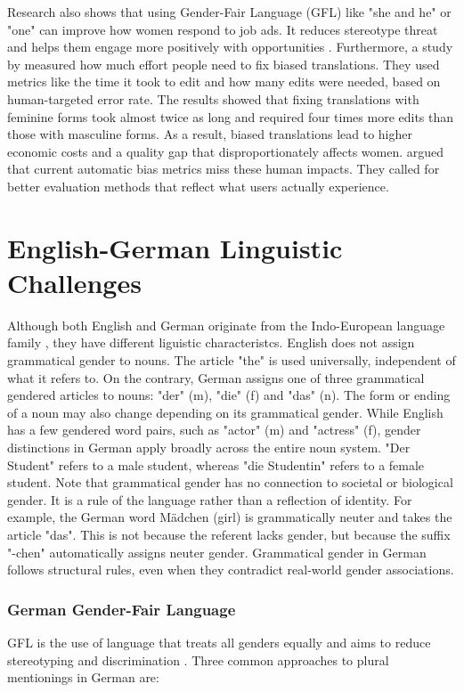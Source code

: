         Research also shows that using Gender-Fair Language (GFL) like "she and he" or "one" can improve how women respond to job ads. It reduces stereotype threat and helps them engage more positively with opportunities \parencite{godsilEffectsGenderRoles2016}. Furthermore, a study by \textcite{savoldiWhatHarmQuantifying2024} measured how much effort people need to fix biased translations. They used metrics like the time it took to edit and how many edits were needed, based on human-targeted error rate. The results showed that fixing translations with feminine forms took almost twice as long and required four times more edits than those with masculine forms. As a result, biased translations lead to higher economic costs and a quality gap that disproportionately affects women. \textcite{savoldiWhatHarmQuantifying2024} argued that current automatic bias metrics miss these human impacts. They called for better evaluation methods that reflect what users actually experience.

    \section{English-German Linguistic Challenges}
        Although both English and German originate from the Indo-European language family \parencite{baldiEnglishIndoEuropeanLanguage2008}, they have different liguistic characteristcs. English does not assign grammatical gender to nouns. The article "the" is used universally, independent of what it refers to. On the contrary, German assigns one of three grammatical gendered articles to nouns: "der" (m), "die" (f) and "das" (n). The form or ending of a noun may also change depending on its grammatical gender. While English has a few gendered word pairs, such as "actor" (m) and "actress" (f), gender distinctions in German apply broadly across the entire noun system. "Der Student" refers to a male student, whereas "die Studentin" refers to a female student. Note that grammatical gender has no connection to societal or biological gender. It is a rule of the language rather than a reflection of identity. For example, the German word Mädchen (girl) is grammatically neuter and takes the article "das". This is not because the referent lacks gender, but because the suffix "-chen" automatically assigns neuter gender. Grammatical gender in German follows structural rules, even when they contradict real-world gender associations.

    \subsubsection{German Gender-Fair Language} \label{subsection:german_gfl}
    GFL is the use of language that treats all genders equally and aims to reduce stereotyping and discrimination \parencite{sczesnyCanGenderFairLanguage2016}. Three common approaches to plural mentionings in German are: 

